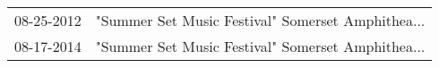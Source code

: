 \begin{supertabular}{ll}
 08-25-2012 &  "Summer Set Music Festival" Somerset Amphithea... \\
 08-17-2014 &  "Summer Set Music Festival" Somerset Amphithea... \\
\end{supertabular}
